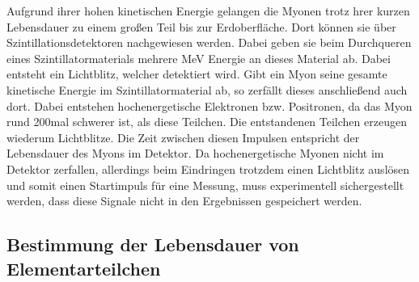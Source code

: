 %
Aufgrund ihrer hohen kinetischen Energie gelangen die Myonen trotz hrer kurzen Lebensdauer zu einem großen Teil bis zur
Erdoberfläche. Dort können sie über Szintillationsdetektoren nachgewiesen werden. Dabei geben sie beim Durchqueren eines
Szintillatormaterials mehrere MeV Energie an dieses Material ab. Dabei entsteht ein Lichtblitz, welcher detektiert wird.
Gibt ein Myon seine gesamte kinetische Energie im Szintillatormaterial ab, so zerfällt dieses anschließend auch dort.
Dabei entstehen hochenergetische Elektronen bzw. Positronen, da das Myon rund 200mal schwerer ist, als diese Teilchen.
Die entstandenen Teilchen erzeugen wiederum Lichtblitze. Die Zeit zwischen diesen Impulsen entspricht der Lebensdauer
des Myons im Detektor. Da hochenergetische Myonen nicht im Detektor zerfallen, allerdings beim Eindringen trotzdem einen
Lichtblitz auslösen und somit einen Startimpuls für eine Messung, muss experimentell sichergestellt werden, dass diese
Signale nicht in den Ergebnissen gespeichert werden.
%
\subsection{Bestimmung der Lebensdauer von Elementarteilchen}

